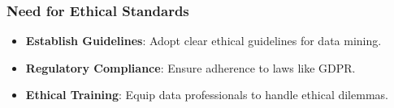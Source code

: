 \documentclass[aspectratio=169]{beamer}
\begin{document}
\begin{frame}[fragile]
  \frametitle{Need for Ethical Standards}
  
  \begin{itemize}
    \item \textbf{Establish Guidelines}: Adopt clear ethical guidelines for data mining.
    \item \textbf{Regulatory Compliance}: Ensure adherence to laws like GDPR.
    \item \textbf{Ethical Training}: Equip data professionals to handle ethical dilemmas.
  \end{itemize}
\end{frame}
\end{document}
